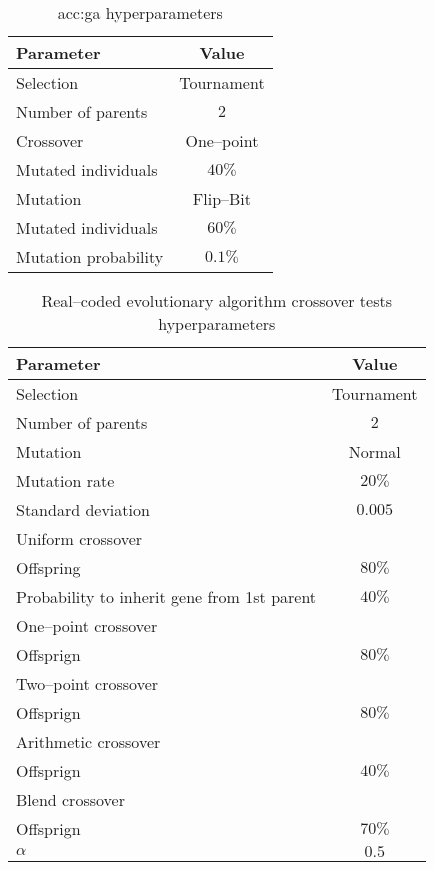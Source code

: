 \begin{table}[h]
    \centering
    \begin{tabular}{|l|c|}
        \hline
        \textbf{Parameter} & \textbf{Value} \\
        \hline
        Selection & Tournament \\
        \quad Number of parents & $2$ \\
        Crossover & One--point \\
        \quad Mutated individuals & $40\%$ \\
        Mutation & Flip--Bit \\
        \quad Mutated individuals & $60\%$ \\
        \quad Mutation probability & $0.1\%$ \\
        \hline
    \end{tabular}
    \caption{\acrlong*{acc:ga} hyperparameters}
    \label{tab:gahyperparameters}
\end{table}

\begin{table}[h]
    \centering
    \begin{tabular}{|l|c|}
        \hline
        \textbf{Parameter} & \textbf{Value} \\
        \hline
        Selection & Tournament \\
        \quad Number of parents & $2$ \\
        Mutation & Normal \\
        \quad Mutation rate & $20\%$ \\
        \quad Standard deviation & $0.005$ \\
        \hline
        Uniform crossover & \\
        \quad Offspring & $80\%$ \\
        \quad Probability to inherit gene from 1st parent & $40\%$ \\
        One--point crossover & \\
        \quad Offsprign & $80\%$ \\
        Two--point crossover & \\
        \quad Offsprign & $80\%$ \\
        Arithmetic crossover & \\
        \quad Offsprign & $40\%$ \\
        Blend crossover & \\
        \quad Offsprign & $70\%$ \\
        \quad $\alpha$ & $0.5$ \\
        \hline
    \end{tabular}
    \caption{Real--coded evolutionary algorithm crossover tests hyperparameters}
    \label{tab:escrossoverhyperparmarameters}
\end{table}

